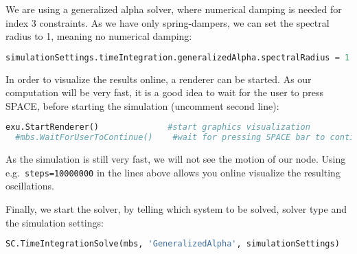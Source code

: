 %
We are using a generalized alpha solver, where numerical damping is needed for index 3 constraints. As we have only spring-dampers, we can set the spectral radius to 1, meaning no numerical damping:
\begin{lstlisting}[language=Python, firstnumber=45]
  simulationSettings.timeIntegration.generalizedAlpha.spectralRadius = 1
\end{lstlisting}
%
In order to visualize the results online, a renderer can be started. As our computation will be very fast, it is a good idea to wait for the user to press SPACE, before starting the simulation (uncomment second line):
\begin{lstlisting}[language=Python, firstnumber=46]
  exu.StartRenderer()              #start graphics visualization
  #mbs.WaitForUserToContinue()    #wait for pressing SPACE bar to continue
\end{lstlisting}
As the simulation is still very fast, we will not see the motion of our node. Using e.g.\ \texttt{steps=10000000} in the lines above allows you online visualize the resulting oscillations.

%
Finally, we start the solver, by telling which system to be solved, solver type and the simulation settings:
\begin{lstlisting}[language=Python, firstnumber=48]
  SC.TimeIntegrationSolve(mbs, 'GeneralizedAlpha', simulationSettings)
\end{lstlisting}
%

